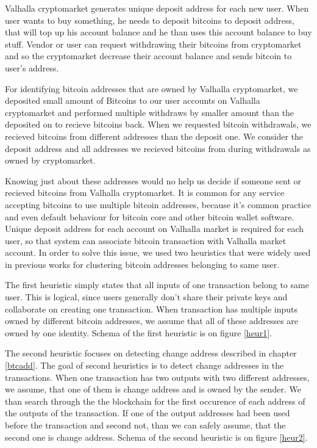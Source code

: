 \documentclass[
  digital, %
  table,   %
  lof,     %
  lot,     %
  oneside
]{fithesis3}
\begin{document}
Valhalla cryptomarket generates unique deposit address for each new user.
When user wants to buy something, he needs to deposit bitcoins to deposit address,
that will top up his account balance and he than uses this account balance to buy stuff.
Vendor or user can request withdrawing their bitcoins from cryptomarket and so
the cryptomarket decrease their account balance and sends bitcoin to user's address.

For identifying bitcoin addresses that are owned by Valhalla cryptomarket, we 
deposited small amount of Bitcoins to our user accounts on Valhalla cryptomarket and
performed multiple withdraws by smaller amount than the deposited on to recieve bitcoins back.
When we requested bitcoin withdrawals, we recieved bitcoins from different addresses
than the deposit one. We consider the deposit address and all addresses we recieved
bitcoins from during withdrawals as owned by cryptomarket.

Knowing just about these addresses would no help us decide
if someone sent or recieved bitcoins from Valhalla cryptomarket.
It is common for any service accepting bitcoins to
use multiple bitcoin addresses, because it's common practice and even default behaviour for
bitcoin core and other bitcoin wallet software. Unique deposit address for each
account on Valhalla market is required for each user, so that system can associate
bitcoin transaction with Valhalla market account.
In order to solve this issue, we used two heuristics that were widely used
in previous works \parencite{androulaki2013evaluating}\parencite{reid2013analysis}
for clustering bitcoin addresses belonging to same user.

The first heuristic simply states that all inputs of one transaction belong to same user. This is logical,
since users generally don't share their private keys and collaborate on creating one transaction.
When transaction has multiple inputs owned by different bitcoin addresses, we assume that all of these addresses are owned by
one identity. Schema of the first heuristic is on figure \ref{heur1}.

The second heuristic focuses on detecting change address described in chapter \ref{btcadd}.
The goal of second heuristics is to detect change addresses in the transactions.
When one transaction has two outputs with two different addresses, we assume, that one of them is change
address and is owned by the sender.
We than search through the the blockchain for the first occurence of each address of the outputs of the 
transaction. If one of the output addresses had been used before the transaction and second not,
than we can safely assume, that the second one is change address\parencite{androulaki2013evaluating}.
Schema of the second heuristic is on figure \ref{heur2}.
\end{document}
